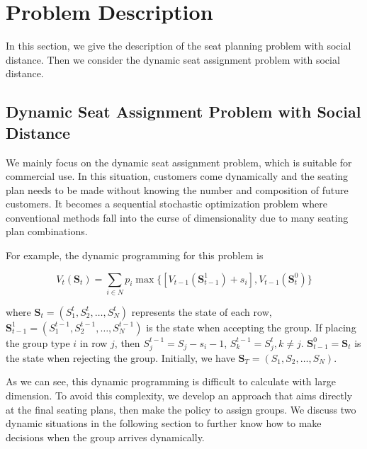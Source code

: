\section{Problem Description}
In this section, we give the description of the seat planning problem with social distance. Then we consider the dynamic seat assignment problem with social distance.


\subsection{Dynamic Seat Assignment Problem with Social Distance}\label{dynamic_demand}

We mainly focus on the dynamic seat assignment problem, which is suitable for commercial use. In this situation, customers come dynamically and the seating plan needs to be made without knowing the number and composition of future customers. It becomes a sequential stochastic optimization problem where conventional methods fall into the curse of dimensionality due to many seating plan combinations. 

For example, the dynamic programming for this problem is


$$V_{t}(\mathbf{S}_{t}) = \sum_{i \in N} p_i \max\{ {[V_{t-1}(\mathbf{S}_{t-1}^{1})+ s_i]}, {V_{t-1}(\mathbf{S}_{t}^{0})}\}$$

where $\mathbf{S}_{t} = (S_1^{t}, S_2^{t}, \ldots, S_{N}^{t})$ represents the state of each row, $\mathbf{S}_{t-1}^{1} = (S_1^{t-1}, S_2^{t-1}, \ldots, S_{N}^{t-1})$ is the state when accepting the group. If placing the group type $i$ in row $j$, then $S_{j}^{t-1} = S_{j}-s_{i}-1$, $S_{k}^{t-1} = S_{j}^{t}, k \neq j$. $\mathbf{S}_{t-1}^{0} = \mathbf{S}_{t}$ is the state when rejecting the group. Initially, we have $\mathbf{S}_{T} = (S_1, S_2, \ldots, S_{N})$.

As we can see, this dynamic programming is difficult to calculate with large dimension. To avoid this complexity, we develop an approach that aims directly at the final seating plans, then make the policy to assign groups. We discuss two dynamic situations in the following section to further know how to make decisions when the group arrives dynamically.




